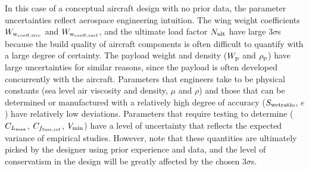 In this case of a conceptual aircraft design with no prior data,
the parameter uncertainties reflect aerospace engineering intuition.
The wing weight coefficients $W_{\rm{w}_{\rm{coeff,strc}}}$ and $W_{\rm{w}_{\rm{coeff,surf}}}$,
and the ultimate load factor $N_{\rm{ult}}$ have
large $3\sigma$s because the build quality of aircraft components is
often difficult to quantify with a large degree of certainty.
The payload weight and density ($W_{\rm{p}}$ and $\rho_{\rm{p}}$) have large uncertainties for similar reasons,
since the payload is often developed concurrently with the aircraft.
Parameters that engineers take to be
physical constants (sea level air viscosity and density, $\mu$ and $\rho$) and those that can be determined or manufactured with a relatively
high degree of accuracy ($S_{\rm{wetratio}}$, $e$) have relatively low deviations.
Parameters that require testing to determine ($C_{L_{\rm{max}}}$, $C_{f_{\rm{fuse, ref}}}$,
$V_{\rm{min}}$) have a level of uncertainty
that reflects the expected variance of empirical studies. However, note that
these quantities are ultimately picked by the designer using prior experience and data,
and the level of conservatism in the
design will be greatly affected by the chosen $3\sigma$s.
